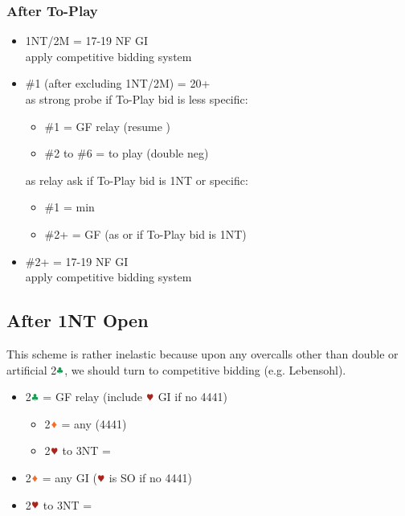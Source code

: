 \documentclass{article}
\begin{document}
\begin{multicols}{2}
\begin{CJK*}{UTF8}{gt}
\subsubsection{After To-Play}
\begin{itemize}
    \item 1NT/2M = 17-19 NF GI \\
        apply competitive bidding system
    \item \#1 (after excluding 1NT/2M) = 20+ \\
        as strong probe if To-Play bid is less specific:
        \begin{itemize}
            \item \#1 = GF relay (resume )
            \item \#2 to \#6 = to play (double neg)
        \end{itemize}
        as relay ask if To-Play bid is 1NT or specific:
        \begin{itemize}
            \item \#1 = min
            \item \#2+ = GF (as  or
                 if To-Play bid is 1NT)
        \end{itemize}
    \item \#2+ = 17-19 NF GI \\
        apply competitive bidding system
\end{itemize}

\subsection{After 1NT Open}\label{sec:1n}
This scheme is rather inelastic because upon any overcalls other than double or artificial 2$\ccc$, we should turn to competitive bidding (e.g. Lebensohl).

\begin{itemize}
    \item 2$\ccc$ = GF relay (include $\hhh$ GI if no 4441)
    \begin{itemize}
        \item 2$\ddd$ = any (4441)
        \item 2$\hhh$ to 3NT = 
    \end{itemize}
    \item 2$\ddd$ = any GI ($\hhh$ is SO if no 4441)
    \item 2$\hhh$ to 3NT = 
\end{itemize}


\end{CJK*}
\end{multicols}
\end{document}
